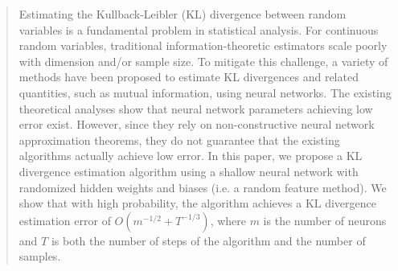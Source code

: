 \documentclass[twoside]{article}
\theoremstyle{definition}
\newcommand{\1}[1]{\scalebox{1.25}{$\mathds{1}$}\left[#1\right]}
\begin{document}


\author{%
Mikil Foss \\
  Mathematics\\
  University of Minnesota\\
  Minneapolis, MN 55455 \\
  \texttt{foss0379@umn.edu} 
   \And
  Andrew Lamperski\\
  Electrical and Computer Engineering\\
  University of Minnesota\\
  Minneapolis, MN 55455\\
  \texttt{alampers@umn.edu}
}



\begin{abstract}
Estimating the Kullback-Leibler (KL) divergence between random variables is a fundamental problem in statistical analysis. For continuous random variables, traditional information-theoretic estimators scale poorly with dimension and/or sample size.  To mitigate this challenge, a variety of methods have been proposed to estimate KL divergences and related quantities, such as mutual information, using neural networks. The existing theoretical analyses show that neural network parameters achieving low error exist.  However, since they rely on non-constructive neural network approximation theorems, they do not guarantee that the existing algorithms actually achieve low error. In this paper, we propose a KL divergence estimation algorithm using a shallow neural network with randomized hidden weights and biases (i.e. a random feature method). We show that with high probability, the algorithm achieves a KL divergence estimation error of $O(m^{-1/2}+T^{-1/3})$, where $m$ is the number of neurons and $T$ is both the number of steps of the algorithm and the number of samples. 
\end{abstract}
\end{document}
